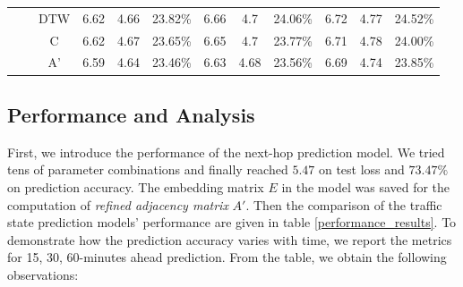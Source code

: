 \begin{table}[t!]
\begin{center}
{\begin{tabular}{c|c|c|ccc|ccc|ccc}
                                                 &                        & DTW                     & 6.62       & 4.66      & 23.82\%     & 6.66      & 4.7       & 24.06\%     & 6.72       & 4.77       & 24.52\%     \\
                                                 &                        & C                       & 6.62       & 4.67      & 23.65\%     & 6.65      & 4.7       & 23.77\%     & 6.71       & 4.78       & 24.00\%     \\
                                                 &                        & A'                      & 6.59       & 4.64      & 23.46\%     & 6.63      & 4.68      & 23.56\%     & 6.69       & 4.74       & 23.85\%     \\
                \bottomrule
            \end{tabular}
        }
    \end{center}
\end{table}

\subsection{Performance and Analysis}
First, we introduce the performance of the next-hop prediction model. We tried tens of parameter combinations and finally reached $5.47$ on test loss and $73.47\%$ on prediction accuracy. The embedding matrix $E$ in the model was saved for the computation of \textit{refined adjacency matrix} $A'$. Then the comparison of the traffic state prediction models' performance are given in table \ref{performance_results}. To demonstrate how the prediction accuracy varies with time, we report the metrics for 15, 30, 60-minutes ahead prediction. From the table, we obtain the following observations:

